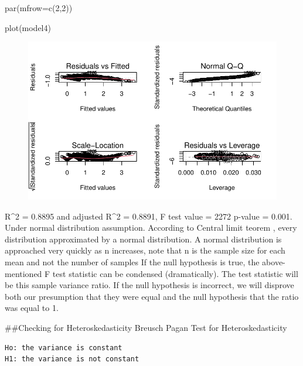 \documentclass[
  letterpaper,
  DIV=11,
  numbers=noendperiod]{scrartcl}
\newenvironment{Shaded}{\begin{snugshade}}{\end{snugshade}}
\newcommand{\AttributeTok}[1]{\textcolor[rgb]{0.40,0.45,0.13}{#1}}
\newcommand{\DecValTok}[1]{\textcolor[rgb]{0.68,0.00,0.00}{#1}}
\newcommand{\FunctionTok}[1]{\textcolor[rgb]{0.28,0.35,0.67}{#1}}
\newcommand{\NormalTok}[1]{\textcolor[rgb]{0.00,0.23,0.31}{#1}}
\begin{document}
\begin{Shaded}
\begin{Highlighting}[]
\FunctionTok{par}\NormalTok{(}\AttributeTok{mfrow=}\FunctionTok{c}\NormalTok{(}\DecValTok{2}\NormalTok{,}\DecValTok{2}\NormalTok{)) }

\FunctionTok{plot}\NormalTok{(model4)}
\end{Highlighting}
\end{Shaded}

\begin{figure}[H]

{\centering \includegraphics{Fertility_Rates_Education_Impact_Botswana_files/figure-pdf/unnamed-chunk-48-1.pdf}

}

\end{figure}

R\^{}2 = 0.8895 and adjusted R\^{}2 = 0.8891, F test value = 2272
p-value = 0.001. Under normal distribution assumption. According to
Central limit teorem , every distribution approximated by a normal
distribution. A normal distribution is approached very quickly as n
increases, note that n is the sample size for each mean and not the
number of samples If the null hypothesis is true, the above-mentioned F
test statistic can be condensed (dramatically). The test statistic will
be this sample variance ratio. If the null hypothesis is incorrect, we
will disprove both our presumption that they were equal and the null
hypothesis that the ratio was equal to 1.

\#\#Checking for Heteroskedasticity Breusch Pagan Test for
Heteroskedasticity

\begin{verbatim}
Ho: the variance is constant
H1: the variance is not constant
\end{verbatim}
\end{document}
